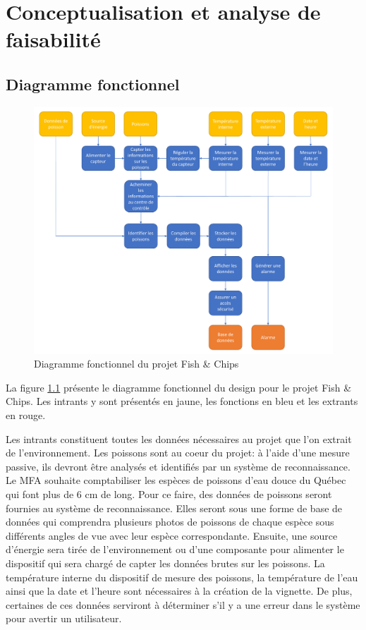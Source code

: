 
%
%

\chapter{Conceptualisation et analyse de faisabilité}
\label{s:conceptualisation_et_analyse}

\section{Diagramme fonctionnel}

\begin{figure}[!htb]
    \centering
    \includegraphics[width=0.85\linewidth]{fig/Diagramme_fonctionnel.pdf}
    \caption{Diagramme fonctionnel du projet Fish \& Chips}
    \label{fig:diagramme_fonctionnel}
\end{figure}

La figure \ref{fig:diagramme_fonctionnel} présente le diagramme fonctionnel du design pour le projet Fish \& Chips. Les intrants y sont présentés en jaune, les fonctions en bleu et les extrants en rouge.

Les intrants constituent toutes les données nécessaires au projet que l'on extrait de l'environnement. Les poissons sont au coeur du projet: à l'aide d'une mesure passive, ils devront être analysés et identifiés par un système de reconnaissance. Le MFA souhaite comptabiliser les espèces de poissons d'eau douce du Québec qui font plus de 6 cm de long. Pour ce faire, des données de poissons seront fournies au système de reconnaissance. Elles seront sous une forme de base de données qui comprendra plusieurs photos de poissons de chaque espèce sous différents angles de vue avec leur espèce correspondante. Ensuite, une source d'énergie sera tirée de l'environnement ou d'une composante pour alimenter le dispositif qui sera chargé de capter les données brutes sur les poissons. La température interne du dispositif de mesure des poissons, la température de l'eau ainsi que la date et l'heure sont nécessaires à la création de la vignette. De plus, certaines de ces données serviront à déterminer s'il y a une erreur dans le système pour avertir un utilisateur.


